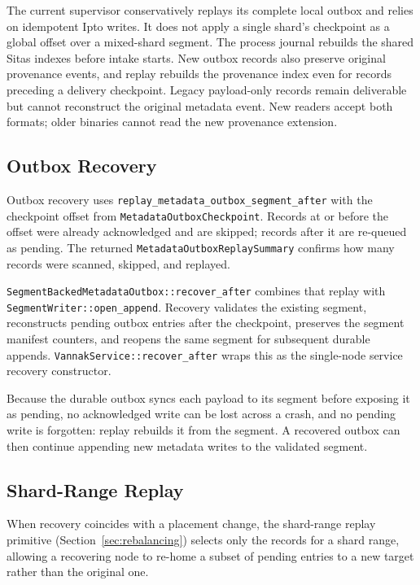 The current supervisor conservatively replays its complete local outbox and
relies on idempotent Ipto writes. It does not apply a single shard's checkpoint
as a global offset over a mixed-shard segment. The process journal rebuilds the
shared Sitas indexes before intake starts. New outbox records also preserve
original provenance events, and replay rebuilds the provenance index even for
records preceding a delivery checkpoint. Legacy payload-only records remain
deliverable but cannot reconstruct the original metadata event. New readers
accept both formats; older binaries cannot read the new provenance extension.

\subsection{Outbox Recovery}

Outbox recovery uses \texttt{replay\_metadata\_outbox\_segment\_after} with the
checkpoint offset from \texttt{MetadataOutboxCheckpoint}. Records at or before
the offset were already acknowledged and are skipped; records after it are
re-queued as pending. The returned \texttt{MetadataOutboxReplaySummary} confirms
how many records were scanned, skipped, and replayed.

\texttt{SegmentBackedMetadataOutbox::recover\_after} combines that replay with
\texttt{SegmentWriter::open\_append}. Recovery validates the existing segment,
reconstructs pending outbox entries after the checkpoint, preserves the segment
manifest counters, and reopens the same segment for subsequent durable appends.
\texttt{VannakService::recover\_after} wraps this as the single-node service
recovery constructor.

\begin{vnote}
Because the durable outbox syncs each payload to its segment before exposing it
as pending, no acknowledged write can be lost across a crash, and no pending
write is forgotten: replay rebuilds it from the segment. A recovered outbox can
then continue appending new metadata writes to the validated segment.
\end{vnote}

\subsection{Shard-Range Replay}

When recovery coincides with a placement change, the shard-range replay
primitive (Section~\ref{sec:rebalancing}) selects only the records for a shard
range, allowing a recovering node to re-home a subset of pending entries to a
new \ipto{} target rather than the original one.

